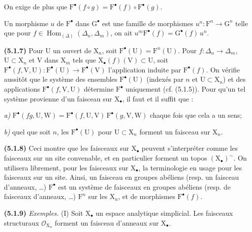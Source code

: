 \documentclass[11pt,leqno]{article}
\begin{document}
On exige de plus que \(\mathrm{F}^{\bullet}(f\circ g)=\mathrm{F}^{\bullet}(f)\circ\mathrm{F}^{\bullet}(g)\).

Un morphisme \(u\) de \(\mathrm{F}^{\bullet}\) dans \(\mathrm{G}^{\bullet}\) est une famille de morphismes \(u^n:\mathrm{F}^n\to\mathrm{G}^n\) telle que pour \(f\in\operatorname{Hom}_{(\Delta)}(\Delta_n,\Delta_m)\), on ait \(u^m\mathrm{F}^{\bullet}(f)=\mathrm{G}^{\bullet}(f)\,u^n\).

\textbf{(5.1.7)} Pour \(\mathrm{U}\) un ouvert de \(\mathrm{X}_n\), soit \(\mathrm{F}^{\bullet}(\mathrm{U})=\mathrm{F}^n(\mathrm{U})\). Pour \(f:\Delta_n\to\Delta_m\), \(\mathrm{U}\subset\mathrm{X}_n\) et \(\mathrm{V}\) dans \(\mathrm{X}_m\) tels que \(\mathrm{X}_{\bullet}(f)(\mathrm{V})\subset\mathrm{U}\), soit \(\mathrm{F}^{\bullet}(f,\mathrm{V},\mathrm{U}):\mathrm{F}^{\bullet}(\mathrm{U})\to\mathrm{F}^{\bullet}(\mathrm{V})\) l’application induite par \(\mathrm{F}^{\bullet}(f)\). On vérifie aussitôt que le système des ensembles \(\mathrm{F}^{\bullet}(\mathrm{U})\) (indexés par \(n\) et \(\mathrm{U}\subset\mathrm{X}_n\)) et des applications \(\mathrm{F}^{\bullet}(f,\mathrm{V},\mathrm{U})\) détermine \(\mathrm{F}^{\bullet}\) uniquement (cf. (5.1.5)). Pour qu’un tel système provienne d’un faisceau sur \(\mathrm{X}_{\bullet}\), il faut et il suffit que :

\noindent\textit{a)} \(\mathrm{F}^{\bullet}(fg,\mathrm{U},\mathrm{W})=\mathrm{F}^{\bullet}(f,\mathrm{U},\mathrm{V})\,\mathrm{F}^{\bullet}(g,\mathrm{V},\mathrm{W})\) chaque fois que cela a un sens;\par
\noindent\textit{b)} quel que soit \(n\), les \(\mathrm{F}^{\bullet}(\mathrm{U})\) pour \(\mathrm{U}\subset\mathrm{X}_n\) forment un faisceau sur \(\mathrm{X}_n\).\par

\textbf{(5.1.8)} Ceci montre que les faisceaux sur \(\mathrm{X}_{\bullet}\) peuvent s’interpréter comme les faisceaux sur un site convenable, et en particulier forment un topos \((\mathrm{X}_{\bullet})^{\sim}\). On utilisera librement, pour les faisceaux sur \(\mathrm{X}_{\bullet}\), la terminologie en usage pour les faisceaux sur un site. Ainsi, un faisceau en groupes abéliens (resp. un faisceau d’anneaux, …) \(\mathrm{F}^{\bullet}\) est un système de faisceaux en groupes abéliens (resp. de faisceaux d’anneaux, …) \(\mathrm{F}^n\) sur les \(\mathrm{X}_n\), et de morphismes \(\mathrm{F}^{\bullet}(f)\).

\textbf{(5.1.9)} \textit{Exemples.} (I) Soit \(\mathrm{X}_{\bullet}\) un espace analytique simplicial. Les faisceaux structuraux \(\mathscr{O}_{\mathrm{X}_n}\) forment un faisceau d’anneaux sur \(\mathrm{X}_{\bullet}\).
\end{document}

